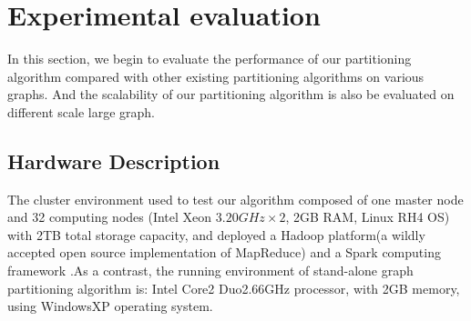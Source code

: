 \documentclass{acm_proc_article-sp}
\begin{document}
\section{Experimental evaluation}
In this section, we begin to evaluate the performance of our partitioning algorithm compared with other existing partitioning algorithms on various graphs. And the scalability of our partitioning algorithm is also be evaluated on different scale large graph.

\subsection {Hardware Description}
The cluster environment used to test our algorithm composed of one master node and 32 computing nodes (Intel Xeon $3.20GHz\times2$, 2GB RAM, Linux RH4 OS) with 2TB total storage capacity, and deployed a Hadoop platform(a wildly accepted open source implementation of MapReduce) and a Spark computing framework \cite{}.As a contrast, the running environment of stand-alone graph partitioning algorithm is: Intel Core2 Duo2.66GHz processor, with 2GB memory, using WindowsXP operating system.
\end{document}
